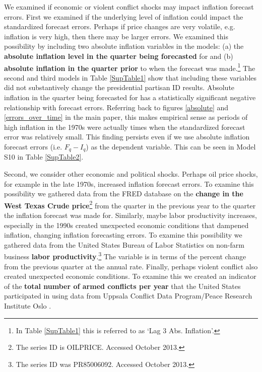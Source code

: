 \documentclass[a4paper]{article}\usepackage[]{graphicx}\usepackage[]{color}
\begin{document}
We examined if economic or violent conflict shocks may impact inflation forecast errors. First we examined if the underlying level of inflation could impact the standardized forecast errors. Perhaps if price changes are very volatile, e.g. inflation is very high, then there may be larger errors. We examined this possibility by including two absolute inflation variables in the models: (a) the \textbf{absolute inflation level in the quarter being forecasted} for and (b) \textbf{absolute inflation in the quarter prior} to when the forecast was made.\footnote{In Table \ref{SupTable1} this is referred to as `Lag 3 Abs. Inflation'.} The second and third models in Table \ref{SupTable1} show that including these variables did not substantively change the presidential partisan ID results. Absolute inflation in the quarter being forecasted for has a statistically significant negative relationship with forecast errors. Referring back to figures \ref{absolute} and \ref{errors_over_time} in the main paper, this makes empirical sense as periods of high inflation in the 1970s were actually times when the standardized forecast error was relatively small. This finding persists even if we use absolute inflation forecast errors (i.e. $F_{q} - I_{q}$) as the dependent variable. This can be seen in Model S10 in Table \ref{SupTable2}.

Second, we consider other economic and political shocks. Perhaps oil price shocks, for example in the late 1970s, increased inflation forecast errors. To examine this possibility we gathered data from the FRED database on the \textbf{change in the West Texas Crude price}\footnote{The series ID is OILPRICE. Accessed October 2013.} from the quarter in the previous year to the quarter the inflation forecast was made for. Similarly, maybe labor productivity increases, especially in the 1990s created unexpected economic conditions that dampened inflation, changing inflation forecasting errors. To examine this possibility we gathered data from the United States Bureau of Labor Statistics on non-farm business \textbf{labor productivity}.\footnote{The series ID was PR85006092. Accessed October 2013.} The variable is in terms of the percent change from the previous quarter at the annual rate. Finally, perhaps violent conflict also created unexpected economic conditions. To examine this we created an indicator of the \textbf{total number of armed conflicts per year} that the United States participated in using data from Uppsala Conflict Data Program/Peace Research Institute Oslo \citep{Harbom2008,Themner2013}. 
\end{document}
